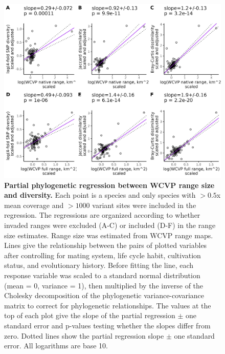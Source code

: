\documentclass[12pt]{article}
\begin{document}
\begin{figure}[H]
    \centering
    \includegraphics[width=\textwidth]{figures/appendix_d/wcvp_area_vs_diversity_corrected_2024-12-12.jpg}
    \caption{\textbf{Partial phylogenetic regression between WCVP range size and diversity.} Each point is a species and only species with $>0.5$x mean coverage and $>1000$ variant sites were included in the regression. The regressions are organized according to whether invaded ranges were excluded (A-C) or included (D-F) in the range size estimates. Range size was estimated from WCVP range maps. Lines give the relationship between the pairs of plotted variables after controlling for mating system, life cycle habit, cultivation status, and evolutionary history. Before fitting the line, each response variable was scaled to a standard normal distribution (mean = 0, variance = 1), then multiplied by the inverse of the Cholesky decomposition of the phylogenetic variance-covariance matrix to correct for phylogenetic relationships. The values at the top of each plot give the slope of the partial regression $\pm$ one standard error and p-values testing whether the slopes differ from zero. Dotted lines show the partial regression slope $\pm$ one standard error. All logarithms are base 10.}
\end{figure}
\end{document}

